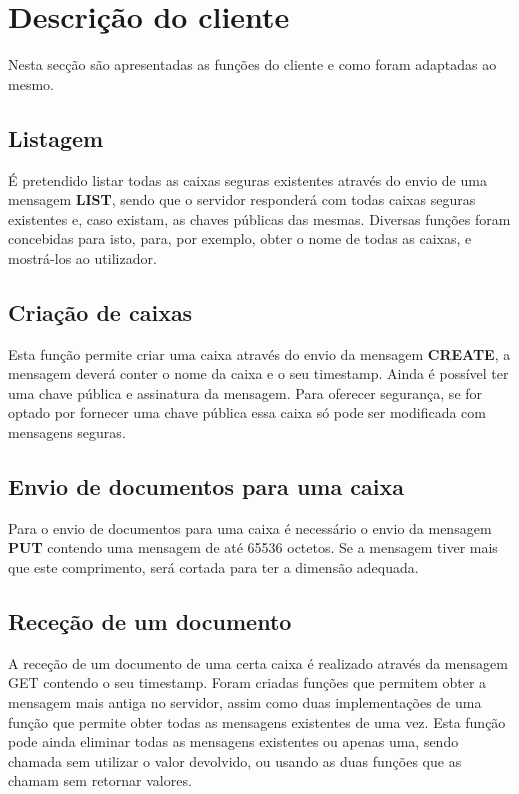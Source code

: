 \documentclass{report}
\begin{document}
\section{Descrição do cliente}
\label{subs.desc}
Nesta secção são apresentadas as funções do cliente e como foram adaptadas ao mesmo.

\subsection{Listagem}
É pretendido listar todas as caixas seguras existentes através do envio de uma mensagem \textbf{LIST}, sendo que o servidor responderá com todas caixas seguras existentes e, caso existam, as chaves públicas das mesmas. Diversas funções foram concebidas para isto, para, por exemplo, obter o nome de todas as caixas, e mostrá-los ao utilizador.


\subsection{Criação de caixas}
Esta função permite criar uma caixa através do envio da mensagem \textbf{CREATE}, a mensagem deverá conter o nome da caixa e o seu timestamp. Ainda é possível ter uma chave pública e assinatura da mensagem. Para oferecer segurança, se for optado por fornecer uma chave pública essa caixa só pode ser modificada com mensagens seguras.


\subsection{Envio de documentos para uma caixa}
Para o envio de documentos para uma caixa é necessário o envio da mensagem \textbf{PUT} contendo uma mensagem de até 65536 octetos. Se a mensagem tiver mais que este comprimento, será cortada para ter a dimensão adequada.


\subsection{Receção de um documento}
A receção de um documento de uma certa caixa é realizado através da mensagem GET contendo o seu timestamp. Foram criadas funções que permitem obter a mensagem mais antiga no servidor, assim como duas implementações de uma função que permite obter todas as mensagens existentes de uma vez. Esta função pode ainda eliminar todas as mensagens existentes ou apenas uma, sendo chamada sem utilizar o valor devolvido, ou usando as duas funções que as chamam sem retornar valores.
\end{document}
